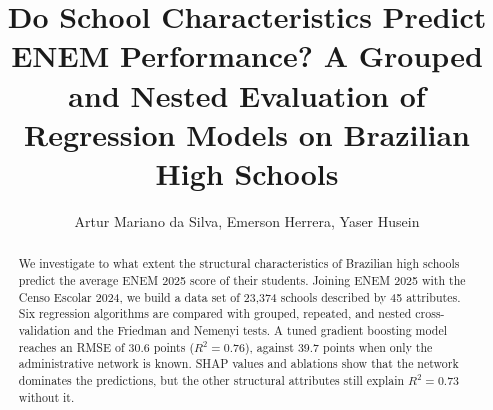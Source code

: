 \documentclass[12pt]{article}
\title{Do School Characteristics Predict ENEM Performance? A Grouped and Nested
  Evaluation of Regression Models on Brazilian High Schools}
\author{Artur Mariano da Silva\inst{1}, Emerson Herrera\inst{1}, Yaser Husein\inst{1}}
\begin{document}
\maketitle

\begin{abstract}
  We investigate to what extent the structural characteristics of Brazilian high schools predict
  the average ENEM 2025 score of their students. Joining ENEM 2025 with the Censo Escolar 2024,
  we build a data set of 23,374 schools described by 45 attributes. Six regression algorithms are
  compared with grouped, repeated, and nested cross-validation and the Friedman and Nemenyi tests.
  A tuned gradient boosting model reaches an RMSE of 30.6 points ($R^2 = 0.76$), against 39.7
  points when only the administrative network is known. SHAP values and ablations show that the
  network dominates the predictions, but the other structural attributes still explain
  $R^2 = 0.73$ without it.
\end{abstract}












\end{document}
